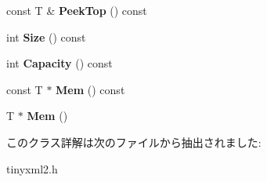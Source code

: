 \begin{DoxyCompactItemize}
\item 
\mbox{\label{classtinyxml2_1_1_dyn_array_a5e4e1e408e646688503dec77c77c9d59}} 
const T \& {\bfseries Peek\+Top} () const
\item 
\mbox{\label{classtinyxml2_1_1_dyn_array_a67614d80847eb92cab330f1a5849a9a2}} 
int {\bfseries Size} () const
\item 
\mbox{\label{classtinyxml2_1_1_dyn_array_a8e101fdf5b4248ac119d7dca6d0f5421}} 
int {\bfseries Capacity} () const
\item 
\mbox{\label{classtinyxml2_1_1_dyn_array_a60b33e61cf10b3fd900ee46692dc0fe9}} 
const T $\ast$ {\bfseries Mem} () const
\item 
\mbox{\label{classtinyxml2_1_1_dyn_array_a2f0842cd666e2ad951f1a8bd6561fa40}} 
T $\ast$ {\bfseries Mem} ()
\end{DoxyCompactItemize}


このクラス詳解は次のファイルから抽出されました\+:\begin{DoxyCompactItemize}
\item 
tinyxml2.\+h\end{DoxyCompactItemize}
